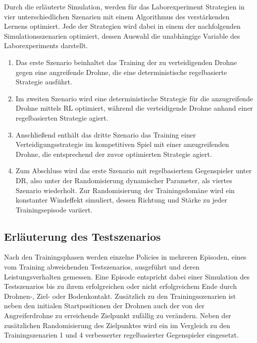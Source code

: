Durch die erläuterte Simulation, werden für das Laborexperiment Strategien in vier unterschiedlichen Szenarien mit einem Algorithmus des verstärkenden Lernens optimiert.
Jede der Strategien wird dabei in einem der nachfolgenden Simulationsszenarien optimiert, dessen Auswahl die unabhängige Variable des Laborexperiments darstellt.
\begin{enumerate}
    \item Das erste Szenario beinhaltet das Training der zu verteidigenden Drohne gegen eine angreifende Drohne, die eine deterministische regelbasierte Strategie ausführt.
    \item Im zweiten Szenario wird eine deterministische Strategie für die anzugreifende Drohne mittels RL optimiert, während die verteidigende Drohne anhand einer regelbasierten Strategie agiert.
    \item Anschließend enthält das dritte Szenario das Training einer Verteidigungsstrategie im kompetitiven Spiel mit einer anzugreifenden Drohne, die entsprechend der zuvor optimierten Strategie agiert.
    \item Zum Abschluss wird das erste Szenario mit regelbasiertem Gegenspieler unter DR, also unter der Randomisierung dynamischer Parameter, als viertes Szenario wiederholt. 
    Zur Randomisierung der Trainingsdomäne wird ein konstanter Windeffekt simuliert, dessen Richtung und Stärke zu jeder Trainingsepisode variiert. 
\end{enumerate}

\subsection{Erläuterung des Testszenarios}

Nach den Trainingsphasen werden einzelne Policies in mehreren Episoden, eines vom Training abweichenden Testszenarios, ausgeführt und deren Leistungsverhalten gemessen.
Eine Episode entspricht dabei einer Simulation des Testszenarios bis zu ihrem erfolgreichen oder nicht erfolgreichem Ende durch Drohnen-, Ziel- oder Bodenkontakt.
Zusätzlich zu den Trainingsszenarien ist neben den initialen Startpositionen der Drohnen auch der von der Angreiferdrohne zu erreichende Zielpunkt zufällig zu verändern.
Neben der zusätzlichen Randomisierung des Zielpunktes wird ein im Vergleich zu den Trainingszenarien 1 und 4 verbesserter regelbasierter Gegenspieler eingesetzt.

